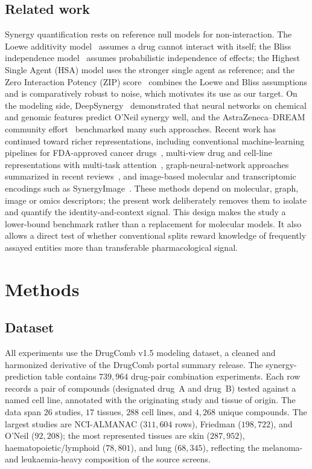 \documentclass{bmcart}
\begin{document}
\subsection*{Related work}
Synergy quantification rests on reference null models for non-interaction. The Loewe additivity
model~\cite{loewe1953} assumes a drug cannot interact with itself; the Bliss independence
model~\cite{bliss1939} assumes probabilistic independence of effects; the Highest Single Agent (HSA)
model uses the stronger single agent as reference; and the Zero Interaction Potency (ZIP)
score~\cite{yadav2015} combines the Loewe and Bliss assumptions and is comparatively robust to noise,
which motivates its use as our target. On the modeling side, DeepSynergy~\cite{preuer2018} demonstrated
that neural networks on chemical and genomic features predict O'Neil synergy well, and the
AstraZeneca--DREAM community effort~\cite{menden2019} benchmarked many such approaches. Recent work has
continued toward richer representations, including conventional machine-learning pipelines for
FDA-approved cancer drugs~\cite{abdelhafeez2024}, multi-view drug and cell-line representations with
multi-task attention~\cite{monem2024}, graph-neural-network approaches summarized in recent
reviews~\cite{besharatifard2024}, and image-based molecular and transcriptomic encodings such as
SynergyImage~\cite{mehrabani2025}. These methods depend on molecular, graph, image or omics
descriptors; the present work deliberately removes them to isolate and quantify the
identity-and-context signal. This design makes the study a lower-bound benchmark rather than a
replacement for molecular models. It also allows a direct test of whether conventional splits reward
knowledge of frequently assayed entities more than transferable pharmacological signal.

\section*{Methods}

\subsection*{Dataset}
All experiments use the DrugComb v1.5 modeling dataset, a cleaned and harmonized derivative of the
DrugComb portal summary release. The synergy-prediction table contains $739{,}964$ drug-pair
combination experiments. Each row records a pair of compounds (designated drug~A and drug~B) tested
against a named cell line, annotated with the originating study and tissue of origin. The data span
$26$ studies, $17$ tissues, $288$ cell lines, and $4{,}268$ unique compounds. The largest studies are
NCI-ALMANAC ($311{,}604$ rows), Friedman ($198{,}722$), and O'Neil ($92{,}208$); the most represented
tissues are skin ($287{,}952$), haematopoietic/lymphoid ($78{,}801$), and lung ($68{,}345$),
reflecting the melanoma- and leukaemia-heavy composition of the source screens.
\end{document}

